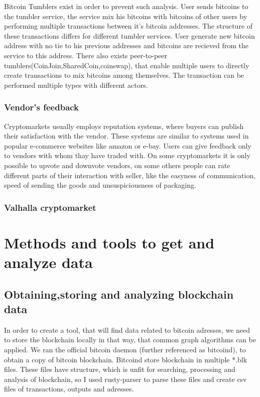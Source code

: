 \documentclass[
  digital, %
  table,   %
  lof,     %
  lot,     %
  oneside
]{fithesis3}
\begin{document}
Bitcoin Tumblers exist in order to prevent such analysis. User sends bitcoins to the tumbler service, the service mix his bitcoins
with bitcoins of other users by performing multiple transactions between it's bitcoin addresses.
The structure of these transactions differs for different tumbler services.
User generate new bitcoin address with no tie to his previous addresses and bitcoins are recieved from the service to this address.
 There also exists peer-to-peer tumblers(CoinJoin,SharedCoin,coinswap),
that enable multiple users to directly create transactions to mix bitcoins among themselves.
The transaction can be performed multiple types with different actors.

\subsection{Vendor's feedback}

Cryptomarkets usually employs reputation systems, where buyers can publish their satisfaction with the vendor.
These systems are similar to systems used in popular e-commerce websites like amazon or e-bay.
Users can give feedback only to vendors with whom thay have traded with.
On some cryptomarkets it is only possible to upvote and downvote vendors, on some others people can
rate different parts of their interaction with seller, like the easyness of communication,
speed of sending the goods and unsuspiciousness of packaging.

\subsection{Valhalla cryptomarket}


\chapter{Methods and tools to get and analyze data}
\section{Obtaining,storing and analyzing blockchain data}
In order to create a tool, that will find data related to bitcoin adresses, we need to store the blockchain locally in that way, that common graph algorithms can be applied.
We ran the official bitcoin daemon (further referenced as bitcoind), to obtain a copy of bitcoin blockchain. Bitcoind store blockchain in multiple *.blk files.
These files have structure, which is unfit for searching, processing and analysis of blockchain, so I used rusty-parser to parse these files and create csv files of transactions, outputs and adresses.
\end{document}
